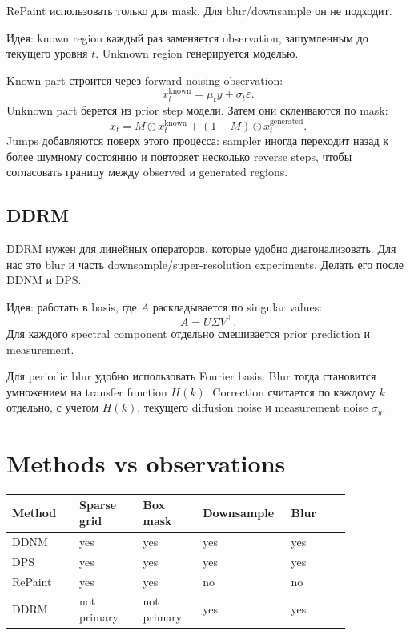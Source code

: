\documentclass[10pt]{article}
\begin{document}
RePaint использовать только для mask. Для blur/downsample он не подходит.

Идея: known region каждый раз заменяется observation, зашумленным до текущего уровня \(t\).
Unknown region генерируется моделью.

Known part строится через forward noising observation:
\[
    x_t^{\mathrm{known}} = \mu_t y + \sigma_t \varepsilon.
\]
Unknown part берется из prior step модели. Затем они склеиваются по mask:
\[
    x_t = M\odot x_t^{\mathrm{known}} + (1-M)\odot x_t^{\mathrm{generated}}.
\]
Jumps добавляются поверх этого процесса: sampler иногда переходит назад к более шумному
состоянию и повторяет несколько reverse steps, чтобы согласовать границу между observed
и generated regions.

\subsection{DDRM}

DDRM нужен для линейных операторов, которые удобно диагонализовать. Для нас это blur и
часть downsample/super-resolution experiments. Делать его после DDNM и DPS.

Идея: работать в basis, где \(A\) раскладывается по singular values:
\[
    A = U\Sigma V^\top.
\]
Для каждого spectral component отдельно смешивается prior prediction и measurement.

Для periodic blur удобно использовать Fourier basis. Blur тогда становится умножением
на transfer function \(H(k)\). Correction считается по каждому \(k\) отдельно, с учетом
\(H(k)\), текущего diffusion noise и measurement noise \(\sigma_y\).

\section{Methods vs observations}

\begin{center}
\begin{tabular}{p{0.18\linewidth}p{0.17\linewidth}p{0.16\linewidth}p{0.17\linewidth}p{0.16\linewidth}}
\toprule
\textbf{Method} & \textbf{Sparse grid} & \textbf{Box mask} &
\textbf{Downsample} & \textbf{Blur} \\
\midrule
DDNM &
yes &
yes &
yes &
yes \\
DPS &
yes &
yes &
yes &
yes \\
RePaint &
yes &
yes &
no &
no \\
DDRM &
not primary &
not primary &
yes &
yes \\
\bottomrule
\end{tabular}
\end{center}
\end{document}
